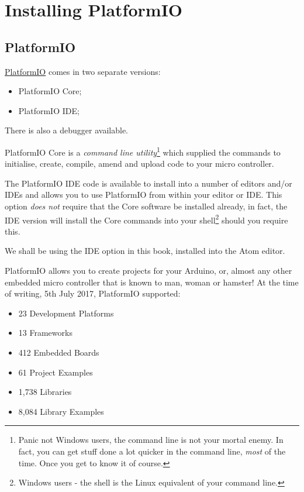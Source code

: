 \chapter{Installing PlatformIO}\label{installing-platformio}

\section{PlatformIO}\label{platformio}

\href{http://platformio.org/}{PlatformIO} comes in two separate versions:

\begin{itemize}
	\item PlatformIO Core;
	\item PlatformIO IDE;
\end{itemize}	

There is also a debugger available. 

PlatformIO Core is a \emph{command line utility}\footnote{Panic not Windows users, the command line is not your mortal enemy. In fact, you can get stuff done a lot quicker in the command line, \emph{most} of the time. Once you get to know it of course.} which supplied the commands to initialise, create, compile, amend and upload code to your micro controller. 

The PlatformIO IDE code is available to install into a number of editors and/or IDEs and allows you to use PlatformIO from within your editor or IDE. This option \emph{does not} require that the Core software be installed already, in fact, the IDE version will install the Core commands into your shell\footnote{Windows users - the shell is the Linux equivalent of your command line.} should you require this.

We shall be using the IDE option in this book, installed into the Atom editor.

PlatformIO allows you to create projects for your  Arduino, or, almost any other embedded micro controller that is known to man, woman or hamster! At the time of writing, 5th July 2017, PlatformIO supported:

\begin{itemize}
\item
  23 Development Platforms
\item
  13 Frameworks
\item
  412 Embedded Boards
\item
  61 Project Examples
\item
  1,738 Libraries
\item
  8,084 Library Examples
\end{itemize}

